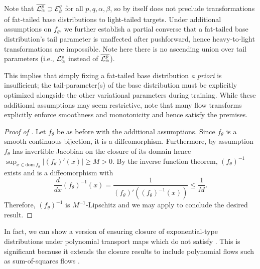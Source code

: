 \documentclass[../../thesis.tex]{subfiles}
\begin{document}
Note that $\overline{\mathcal{L}^p_\alpha} \supset \mathcal{E}^q_\beta$ for all $p,q,\alpha,\beta$, so 
by itself does not preclude transformations of fat-tailed base distributions to light-tailed targets.
Under additional assumptions on $f_\theta$, we further establish a partial converse that a fat-tailed base distribution's tail parameter is unaffected after pushforward,
hence heavy-to-light transformations are impossible. Note here there is no ascending union over
tail parameters (i.e., $\mathcal{L}^p_\alpha$ instead of $\overline{\mathcal{L}^p_\alpha}$).


This implies that simply fixing a fat-tailed base
distribution \emph{a priori} is insufficient; the tail-parameter(s) of the base distribution must be explicitly optimized alongside
the other variational parameters during training.
While these additional assumptions may seem restrictive, note that many flow transforms
explicitly enforce smoothness and monotonicity \citep{wehenkel2019unconstrained,huang2018neural,durkan2019neural}
and hence satisfy the premises.

\begin{proof}[Proof of ]
  Let $f_\theta$ be as before with the additional assumptions.
  Since $f_\theta$ is a smooth continuous bijection, it is a diffeomorphism.
  Furthermore, by assumption $f_\theta$ has invertible Jacobian on the closure of its
  domain hence $\sup_{x \in \text{dom}~f_\theta} \lvert (f_\theta)'(x) \rvert \geq M > 0$.
  By the inverse function theorem, $(f_\theta)^{-1}$ exists and is
  a diffeomorphism with
  \[
    \frac{d}{dx}(f_\theta)^{-1}(x) = \frac{1}{(f_\theta)'((f_\theta)^{-1}(x))} \leq \frac{1}{M} .
  \]
  Therefore, $(f_\theta)^{-1}$ is $M^{-1}$-Lipschitz and we may apply
   to conclude the desired result.
\end{proof}


In fact, we can show a version of  ensuring closure of exponential-type
distributions under polynomial transport maps which do not satisfy .
This is significant because it extends the closure results to
include polynomial flows such as sum-of-squares flows \citep{jaini2019sum}.
\end{document}
